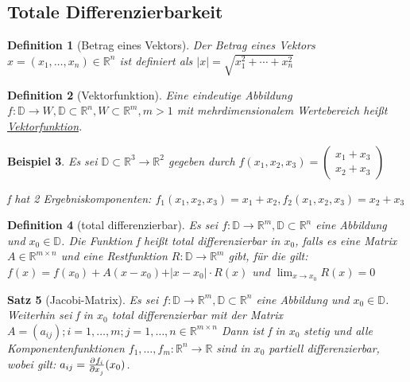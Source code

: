 \documentclass[fontset=ubuntu,11pt,a4paper,fleqn,headsepline]{scrreprt}
\newtheorem{defi}{Definition}[section]
\newtheorem{beispiel}[defi]{Beispiel}
\newtheorem{satz}[defi]{Satz}
\begin{document}
\begin{multicols}{2}
    \section*{Totale Differenzierbarkeit}
    
    \begin{defi}[Betrag eines Vektors]
        Der Betrag eines Vektors \(x=(x_1,\dots,x_n)\in\mathbb{R}^n\) ist definiert als
        \(\vert x \vert = \sqrt{x_1^2+\cdots+x_n^2}\)
    \end{defi}
    
    \begin{defi}[Vektorfunktion]
        Eine eindeutige Abbildung \(f:\mathbb{D}\to W,\mathbb{D}\subset\mathbb{R}^n,W\subset\mathbb{R}^m,m>1\) mit mehrdimensionalem Wertebereich heißt \underline{Vektorfunktion}.
    \end{defi}
    
    \begin{beispiel}
        Es sei \(\mathbb{D}\subset\mathbb{R}^3\to\mathbb{R}^2\) gegeben durch \(f(x_1,x_2,x_3)=\begin{pmatrix}
        x_1+x_3 \\ x_2+x_3
        \end{pmatrix}\)
        
        f hat 2 Ergebniskomponenten: \(f_1(x_1,x_2,x_3)=x_1+x_2,f_2(x_1,x_2,x_3)=x_2+x_3\)
    \end{beispiel}
    
    \begin{defi}[total differenzierbar]
        Es sei \(f:\mathbb{D}\to \mathbb{R}^m,\mathbb{D}\subset\mathbb{R}^n\) eine Abbildung und \(x_0\in\mathbb{D}\). Die Funktion f heißt total differenzierbar in \(x_0\), falls es eine Matrix \(A\in\mathbb{R}^{m\times n}\) und eine Restfunktion \(R:\mathbb{D}\to\mathbb{R}^m\) gibt, für die gilt: \(f(x)=f(x_0)+A(x-x_0)+\vert x-x_0 \vert\cdot R(x)\) und \(\lim_{x\to x_0} R(x)=0\)
    \end{defi}
    
    \begin{satz}[Jacobi-Matrix]
        Es sei \(f:\mathbb{D}\to \mathbb{R}^m,\mathbb{D}\subset\mathbb{R}^n\) eine Abbildung und \(x_0\in\mathbb{D}\). Weiterhin sei f in \(x_0\) total differenzierbar mit der Matrix
        \(A=(a_{ij});i=1,\dots,m;j=1,\dots,n \in\mathbb{R}^{m\times n}\)
        Dann ist f in \(x_0\) stetig und alle Komponentenfunktionen \(f_1,\dots,f_m:\mathbb{R}^n\to\mathbb{R}\) sind in \(x_0\) partiell differenzierbar, wobei gilt: \(a_{ij}=\pd{f_i}{x_j}(x_0)\).
        

\end{satz}
\end{multicols}
\end{document}
